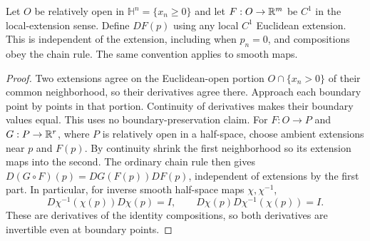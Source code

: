 \begin{lemma}\label{lem:halfspace-derivatives}
Let $O$ be relatively open in $\mathbb H^n=\{x_n\geq0\}$ and let
$F:O\to\mathbb{R}^m$ be $C^1$ in the local-extension sense. Define $DF(p)$
using any local $C^1$ Euclidean extension. This is independent of the
extension, including when $p_n=0$, and compositions obey the chain rule.
The same convention applies to smooth maps.
\end{lemma}
\begin{proof}
Two extensions agree on the Euclidean-open portion $O\cap\{x_n>0\}$
of their common neighborhood, so their derivatives agree there. Approach
each boundary point by points in that portion. Continuity of derivatives
makes their boundary values equal. This uses no boundary-preservation claim.
For $F:O\to P$ and $G:P\to\mathbb{R}^r$, where $P$ is relatively open in a
half-space, choose ambient extensions near $p$ and $F(p)$. By continuity
shrink the first neighborhood so its extension maps into the second.
The ordinary chain rule then gives
$D(G\circ F)(p)=DG(F(p))DF(p)$, independent of extensions by the first part.
In particular, for inverse smooth half-space maps $\chi,\chi^{-1}$,
\[
D\chi^{-1}(\chi(p))D\chi(p)=I,\qquad
D\chi(p)D\chi^{-1}(\chi(p))=I.
\]
These are derivatives of the identity compositions, so both derivatives
are invertible even at boundary points.
\end{proof}


